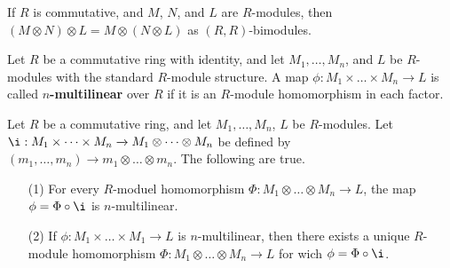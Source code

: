 \begin{corollary}
    If $R$ is commutative, and $M$, $N$, and $L$ are  $R$-modules, then  $(M
    \otimes N) \otimes L=M \otimes (N \otimes L)$ as $(R,R)$-bimodules.
\end{corollary}

\begin{definition}
    Let $R$ be a commutative ring with identity, and let $M_1, \dots, M_n$, and
    $L$ be $R$-modules with the standard $R$-module structure. A map  $\phi:M_1
    \times \dots \times M_n \xrightarrow{} L$ is called \textbf{$n$-multilinear}
    over $R$ if it is an  $R$-module homomorphism in each factor.
\end{definition}

\begin{lemma}\label{4.4.10}
    Let $R$ be a commutative ring, and let  $M_1, \dots, M_n$, $L$ be
    $R$-modules. Let $\i:M_1 \times \dots \times M_n \xrightarrow{} M_1 \otimes
    \dots \otimes M_n$ be defined by $(m_1,\dots,m_n) \xrightarrow{} m_1 \otimes
    \dots \otimes m_n$. The following are true.
    \begin{enumerate}
        \item[(1)] For every $R$-moduel homomorphism  $\Phi:M_1 \otimes \dots
            \otimes M_n \xrightarrow{} L$, the map $\phi=\Phi \circ \i$ is
            $n$-multilinear.

        \item[(2)] If $\phi:M_1 \times \dots \times M_1 \xrightarrow{} L$ is
            $n$-multilinear, then there exists a unique $R$-module homomorphism
            $\Phi:M_1 \otimes \dots \otimes M_n \xrightarrow{} L$ for wich
            $\phi=\Phi \circ \i$.
    \end{enumerate}
\end{lemma}

